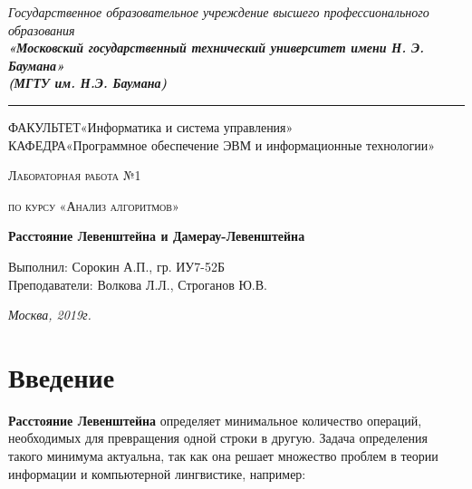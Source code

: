 \documentclass[12pt]{report}
\newcommand{\hsp}{\hspace{20pt}} %
\begin{document}
    \begin{titlepage}

        \begin{center}
            \large
            {\sl Государственное образовательное учреждение высшего профессионального образования\\
            {\bf«Московский государственный технический университет имени Н. Э. Баумана»\\
				(МГТУ им. Н.Э. Баумана)}}
				\noindent\rule{\textwidth}{2pt}
		\end{center}
				{\large ФАКУЛЬТЕТ\hsp«Информатика и система управления»}\\
				{\large КАФЕДРА\hsp«Программное обеспечение ЭВМ и информационные технологии»}\\
		\begin{center}
            \vspace{3cm}

				{\scshape\large Лабораторная работа №1 \par}
				\vspace{0.5cm}	
				{\scshape\large по курсу «Анализ алгоритмов» \par}
				\vspace{1.5cm}
				{\huge\bfseries Расстояние Левенштейна и Дамерау-Левенштейна \par}
				\vspace{2cm}
				\large Выполнил: Сорокин А.П., гр. ИУ7-52Б\\
				\vspace{0.5cm}
				{\large Преподаватели: Волкова Л.Л., Строганов Ю.В.}
			
				\vfill
				\large \textit {Москва, 2019г.}
            
            \end{center}

    \end{titlepage}
	
	\tableofcontents

	\chapter*{Введение}

	{\bf Расстояние Левенштейна} определяет минимальное количество операций, необходимых для превращения одной строки в другую. Задача определения такого минимума актуальна, так как она решает множество проблем в теории информации и компьютерной лингвистике, например:
\end{document}
